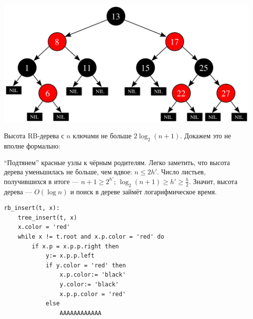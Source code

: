 \includegraphics[width=15cm]{images/19_rb_tree.pdf}

Высота RB-дерева с $n$ ключами не больше $2\log_2(n+1)$. Докажем это не вполне формально:

``Подтянем'' красные узлы к чёрным родителям. Легко заметить, что высота дерева уменьшилась не больше, чем вдвое: $n \leqslant 2h'$. Число листьев, получившихся в итоге --- $n+1 \geqslant 2^{h'}$; $\log_2(n+1)\geqslant h'\geqslant\frac{h}{2}$. Значит, высота дерева --- $O(\log n)$ и поиск в дереве займёт логарифмическое время.

\begin{lstlisting}
rb_insert(t, x):
    tree_insert(t, x)
    x.color = 'red'
    while x != t.root and x.p.color = 'red' do
        if x.p = x.p.p.right then
            y:= x.p.p.left
            if y.color = 'red' then
                x.p.color:= 'black'
                y.color:= 'black'
                x.p.p.color = 'red'
            else
                AAAAAAAAAAAA
\end{lstlisting}

